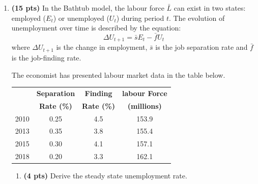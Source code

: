 \documentclass[14pt, oneside]{memoir}
\begin{document}
\begin{enumerate}[label=\textbf{\arabic*.}, itemsep=15pt]
\begin{enumerate}
	The $f'$ would become 
		\[(1.13)10131.61 = 16000 + 1.05 f' - 3000\]
	\[f' = -1477.41\]
	\item No, the Richardian equivalence would not apply in this case, although the end result is the same in this particular case. The Richardian equivalence suggests that government borrowing to finance expenditures (change of the timing of tax) does not affect the consumption, because consumer would adjust their profile using the financial market as well. In our case, the government does not change the timing of the tax but the type of tax. So, although the consumption does not change at the end (the optimal consumption in part f and part d are the same), it is not because of the Richardian equivalence. 
	
	*If the answer is based on the optimal c only and have correctly stating the fact about the Richardian equivalence, we may give close to full mark (or even full mark).
\end{enumerate}

\vspace{1cm}
\newpage


\item  \textbf{(15 pts)}\label{P2} 
In the Bathtub model, the labour force $\bar{L}$ can exist in two states: employed ($E_t$) or unemployed ($U_t$) during period $t$. The evolution of unemployment over time is described by the equation:
\[\Delta U_{t+1} = \bar{s} E_t -\bar{f} U_t\]
where $\Delta U_{t+1}$ is the change in employment, $\bar{s}$ is the job separation rate and $\bar{f}$ is the job-finding rate.

The economist has presented labour market data in the table below.
\begin{table}[htbp]
	\centering
	\begin{tabular}{rccc}
		\toprule
		 & \textbf{Separation } & \textbf{Finding } & \textbf{labour Force} \\
		&   \textbf{Rate (\%) }   &   \textbf{Rate (\%)}    & \textbf{(millions)} \\
		\midrule
		2010  & 0.25   & 4.5   & 153.9 \\
		2013  & 0.35   & 3.8   & 155.4 \\
		2015  & 0.30   & 4.1   & 157.1 \\
		2018  & 0.20   & 3.3   & 162.1 \\
		\bottomrule
	\end{tabular}%
\end{table}%

\begin{enumerate}[label=(\alph*)]
	\item \textbf{(4 pts)} Derive the steady state unemployment rate.


\end{enumerate}
\end{enumerate}
\end{document}

